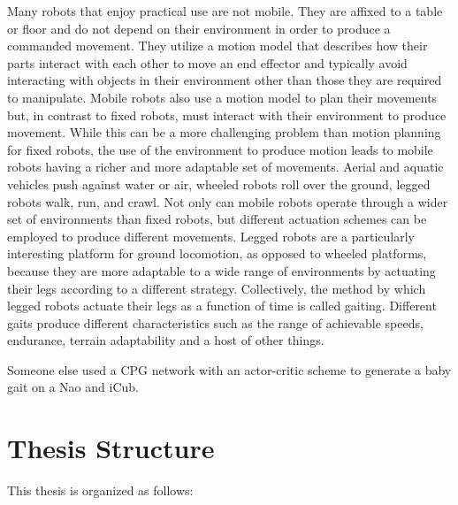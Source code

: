 Many robots that enjoy practical use are not mobile. They are affixed to a table or floor
and do not depend on their environment in order to produce a commanded movement. They 
utilize a motion model that describes how their parts interact with each other to move an
end effector and typically avoid interacting with objects in their environment other than those
they are required to manipulate.
Mobile robots also use a motion model to plan their movements but, in contrast to fixed robots, must interact
with their environment to produce movement. 
While this can be a more challenging problem than motion planning for fixed robots, the use of
the environment to produce motion leads to mobile robots having a richer and more adaptable set of movements.
Aerial and aquatic vehicles push against water or air,
wheeled robots roll over the ground, legged robots walk, run, and crawl.
Not only can mobile robots operate through a wider set of environments than fixed robots, but different
actuation schemes can be employed to produce different movements. Legged robots are a particularly interesting
platform for ground locomotion, as opposed to wheeled platforms, because they are more adaptable
to a wide range of environments by actuating their legs according to a different strategy.
Collectively, the method by which legged robots actuate their legs as a function of time is called 
gaiting. Different gaits produce different characteristics such as the range of
achievable speeds, endurance, terrain adaptability and a host of other things.



Someone else used a CPG network with an actor-critic scheme to generate a baby gait on a Nao and iCub.

\section{Thesis Structure}
This thesis is organized as follows: 










